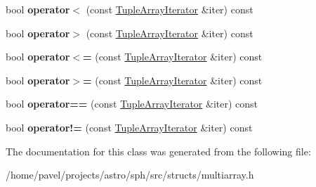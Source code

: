 \begin{DoxyCompactItemize}
\hypertarget{classTupleArrayIterator_a655180c490a65ca07b3646e3a07967b1}{}\label{classTupleArrayIterator_a655180c490a65ca07b3646e3a07967b1} 
bool {\bfseries operator$<$} (const \hyperlink{classTupleArrayIterator}{Tuple\+Array\+Iterator} \&iter) const
\item 
\hypertarget{classTupleArrayIterator_a7855449a1f88a1fe5e11821dc65a1652}{}\label{classTupleArrayIterator_a7855449a1f88a1fe5e11821dc65a1652} 
bool {\bfseries operator$>$} (const \hyperlink{classTupleArrayIterator}{Tuple\+Array\+Iterator} \&iter) const
\item 
\hypertarget{classTupleArrayIterator_a128ef6d09df29acc1798c896db2bf93f}{}\label{classTupleArrayIterator_a128ef6d09df29acc1798c896db2bf93f} 
bool {\bfseries operator$<$=} (const \hyperlink{classTupleArrayIterator}{Tuple\+Array\+Iterator} \&iter) const
\item 
\hypertarget{classTupleArrayIterator_aaab6bf464a360f08369d94ae6a989caf}{}\label{classTupleArrayIterator_aaab6bf464a360f08369d94ae6a989caf} 
bool {\bfseries operator$>$=} (const \hyperlink{classTupleArrayIterator}{Tuple\+Array\+Iterator} \&iter) const
\item 
\hypertarget{classTupleArrayIterator_acd09b03581193d2f3315ebf9e46a3a72}{}\label{classTupleArrayIterator_acd09b03581193d2f3315ebf9e46a3a72} 
bool {\bfseries operator==} (const \hyperlink{classTupleArrayIterator}{Tuple\+Array\+Iterator} \&iter) const
\item 
\hypertarget{classTupleArrayIterator_a41ea137201f4c14da02103cfcf78bae7}{}\label{classTupleArrayIterator_a41ea137201f4c14da02103cfcf78bae7} 
bool {\bfseries operator!=} (const \hyperlink{classTupleArrayIterator}{Tuple\+Array\+Iterator} \&iter) const
\end{DoxyCompactItemize}


The documentation for this class was generated from the following file\+:\begin{DoxyCompactItemize}
\item 
/home/pavel/projects/astro/sph/src/structs/multiarray.\+h\end{DoxyCompactItemize}
